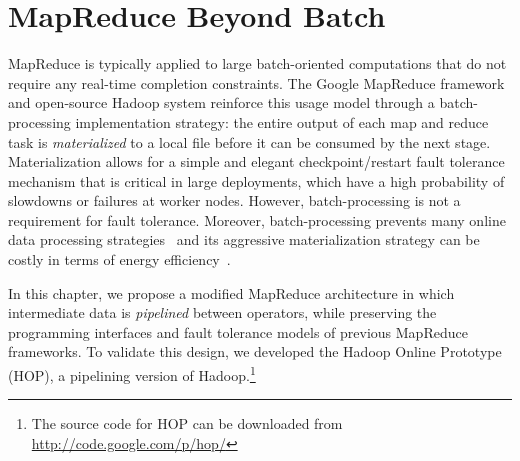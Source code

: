 \chapter[MapReduce Beyond Batch]{MapReduce Beyond Batch}
\label{ch:hop}

MapReduce is typically applied to large batch-oriented computations that do
not require any real-time completion constraints.  The Google MapReduce
framework~\cite{mapreduce-osdi} and open-source Hadoop system reinforce this
usage model through a batch-processing implementation strategy: the entire
output of each map and reduce task is \emph{materialized} to a local file
before it can be consumed by the next stage.  Materialization allows for a
simple and elegant checkpoint/restart fault tolerance mechanism that is critical
in large deployments, which have a high probability of slowdowns or failures at
worker nodes. However, batch-processing is not a requirement for fault tolerance. 
Moreover, batch-processing prevents many online data processing
strategies~\cite{onlineagg, borealis, stream, tcq-cidr} and its aggressive materialization
strategy can be costly in terms of energy efficiency~\cite{yanpei}.

In this chapter, we propose a modified MapReduce architecture in which intermediate data is
\emph{pipelined} between operators, while preserving the programming interfaces
and fault tolerance models of previous MapReduce frameworks. To validate this
design, we developed the Hadoop Online Prototype (HOP), a pipelining version of
Hadoop.\footnote{The source code for HOP can be downloaded from \url{http://code.google.com/p/hop/}}

